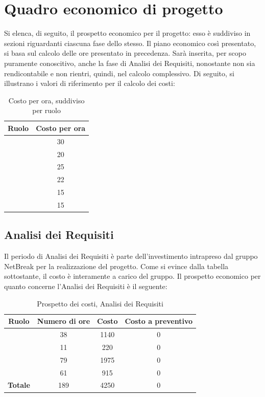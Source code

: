 \newpage

\section{Quadro economico di progetto}
Si elenca, di seguito, il prospetto economico per il progetto: esso è suddiviso in sezioni riguardanti ciascuna fase dello stesso. Il piano economico così presentato, si basa sul calcolo delle ore presentato in precedenza. Sarà inserita, per scopo puramente conoscitivo, anche la fase di Analisi dei Requisiti, nonostante non sia rendicontabile e non rientri, quindi, nel calcolo complessivo. Di seguito, si illustrano i valori di riferimento per il calcolo dei costi:

\begin{table}[H]
	\begin{center}
		\begin{tabular}{|c|c|}
			\hline
			\textbf{Ruolo}	& \textbf{Costo per ora} \\
			\hline
			\Res	&	30	\\
			\hline
			\Amm	&	20	\\
			\hline
			\Ana	&	25	\\
			\hline
			\Prog	&	22	\\
			\hline
			\Progr	&	15	\\
			\hline
			\Ver	&	15	\\
			\hline
		\end{tabular}
	\end{center}
	\caption{Costo per ora, suddiviso per ruolo}
\end{table}

\subsection{Analisi dei Requisiti}

Il periodo di Analisi dei Requisiti è parte dell'investimento intrapreso dal gruppo NetBreak per la realizzazione del progetto. Come si evince dalla tabella sottostante, il costo è interamente a carico del gruppo. Il prospetto economico per quanto concerne l'Analisi dei Requisiti è il seguente:


\begin{table}[H]
	\begin{center}
		\begin{tabular}{|c|c|c|c|}
			\hline
			\textbf{Ruolo}	& \textbf{Numero di ore} & \textbf{Costo} & \textbf{Costo a preventivo} \\
			\hline
			\Res	&	38  &	1140 &  0	\\
			\hline
			\Amm	&	11  &	220  &  0	\\
			\hline
			\Ana	&	79  &	1975 &  0	\\
			\hline
			\Ver	&	61  &	915 &  0	\\
			\hline
			\textbf{Totale}  &	189	&	4250  &  0	\\
			\hline
		\end{tabular}
	\end{center}
	\caption{Prospetto dei costi, Analisi dei Requisiti }
\end{table}

